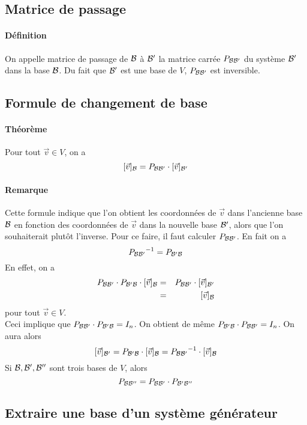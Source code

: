 {%
\subsection{Matrice de passage}
%
\paragraph{Définition} On appelle matrice de passage de $\mathcal{B}$ à $\mathcal{B}'$ la matrice carrée $P_{\mathcal{B} \mathcal{B}'}$ du système $\mathcal{B}'$ dans la base $\mathcal{B}$. Du fait que $\mathcal{B}'$ est une base de $V$, $P_{\mathcal{B} \mathcal{B}'}$ est inversible.

%
\subsection{Formule de changement de base}
%
\paragraph{Théorème} Pour tout $\vec{v} \in V$, on a 
$$[\vec{v}]_{\mathcal{B}} = P_{\mathcal{B} \mathcal{B}'} \cdot [\vec{v}]_{\mathcal{B}'}$$

\paragraph{Remarque} Cette formule indique que l'on obtient les coordonnées de $\vec{v}$ dans l'ancienne base $\mathcal{B}$ en fonction des coordonnées de $\vec{v}$ dans la nouvelle base $\mathcal{B}'$, alors que l'on souhaiterait plutôt l'inverse. Pour ce faire, il faut calculer $P_{\mathcal{B} \mathcal{B}'}$. En fait on a
$${P_{\mathcal{B} \mathcal{B}'}}^{-1} = P_{\mathcal{B}' \mathcal{B}}$$
En effet, on a
\begin{eqnarray*}
  P_{\mathcal{B} \mathcal{B}'} \cdot P_{\mathcal{B}' \mathcal{B}} \cdot [\vec{v}]_{\mathcal{B}} &=& P_{\mathcal{B} \mathcal{B}'} \cdot [\vec{v}]_{\mathcal{B}'} \\
   &=& [\vec{v}]_{\mathcal{B}}
\end{eqnarray*}
pour tout $\vec{v} \in V$. \\
Ceci implique que $P_{\mathcal{B} \mathcal{B}'} \cdot P_{\mathcal{B}' \mathcal{B}} = I_n$. On obtient de même $P_{\mathcal{B}' \mathcal{B}} \cdot P_{\mathcal{B} \mathcal{B}'} = I_n$. On aura alors
$$[\vec{v}]_{\mathcal{B}'} = P_{\mathcal{B}' \mathcal{B}} \cdot [\vec{v}]_{\mathcal{B}} = {P_{\mathcal{B} \mathcal{B}'}}^{-1} \cdot [\vec{v}]_{\mathcal{B}}$$
Si $\mathcal{B}, \mathcal{B}', \mathcal{B}''$ sont trois bases de $V$, alors
$$P_{\mathcal{B} \mathcal{B}''} = P_{\mathcal{B} \mathcal{B}'} \cdot P_{\mathcal{B}' \mathcal{B}''}$$

%
\subsection{Extraire une base d'un système générateur}
%
}
